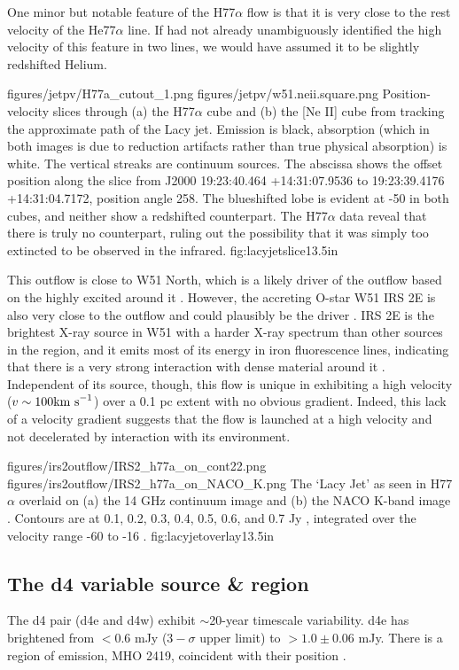 One minor but notable feature of the H77$\alpha$ flow is that it is very close
to the rest velocity of the He77$\alpha$ line.  If \citet{Lacy2007a} had not
already unambiguously identified the high velocity of this feature in two
lines, we would have assumed it to be slightly redshifted Helium.

\FigureTwo
{figures/jetpv/H77a_cutout_1.png}
{figures/jetpv/w51.neii.square.png}
{Position-velocity slices through (a) the H77$\alpha$ cube and (b) the [Ne II]
cube from \citet{Lacy2007a} tracking the approximate path of the Lacy jet.  Emission is black,
absorption (which in both images is due to reduction artifacts rather than true
physical absorption) is white.  The vertical streaks are continuum sources.
The
abscissa shows the offset position along the slice from J2000 19:23:40.464
+14:31:07.9536 to 19:23:39.4176 +14:31:04.7172, position angle 258\arcdeg.
The blueshifted lobe is evident at -50 \kms in both cubes, and neither show a
redshifted counterpart.  The H77$\alpha$ data reveal that there is truly no
counterpart, ruling out the possibility that it was simply too extincted to be
observed in the infrared.}
{fig:lacyjetslice}{1}{3.5in}

This outflow is close to W51 North, which is a likely driver of the outflow based
on the highly excited \ammonia around it \citep{Henkel2013a,Goddi2015a}.  However,
the accreting O-star W51 IRS 2E is also very close to the outflow and could plausibly
be the driver \citep{Barbosa2008a}.  IRS 2E is the brightest X-ray source in
W51 with a harder X-ray spectrum than other sources in the region, and it emits
most of its energy in iron fluorescence lines, indicating that there is a very
strong interaction with dense material around it \citep{Townsley2014a}.
Independent of its source, though, this flow is unique in exhibiting a high
velocity ($v\sim100 \textrm{km~s}^{-1}$) over a 0.1 pc extent with no obvious gradient.
Indeed, this lack of a velocity gradient suggests that the flow is launched
at a high velocity and not decelerated by interaction with its environment.


\FigureTwo
{figures/irs2outflow/IRS2_h77a_on_cont22.png} %
{figures/irs2outflow/IRS2_h77a_on_NACO_K.png} %
{The `Lacy Jet' as seen in H77$\alpha$ overlaid on (a) the 14 GHz continuum
image and (b) the NACO K-band image \citep{Barbosa2008a}.  Contours are at 
0.1, 0.2, 0.3, 0.4, 0.5, 0.6, and 0.7 Jy \kms, integrated over the velocity
range -60 to -16 \kms.}
{fig:lacyjetoverlay}{1}{3.5in}

\subsection{The d4 variable source \& \hh region}
The d4 pair (d4e and d4w) exhibit $\sim$20-year timescale variability.  d4e has
brightened from $<0.6$ mJy ($3-\sigma$ upper limit) to $>1.0\pm0.06$ mJy.
There is a region of \hh emission, MHO 2419, coincident with their position
\citep[Figure \ref{fig:d4h2}][]{Hodapp2002a,Froebrich2011a}.


